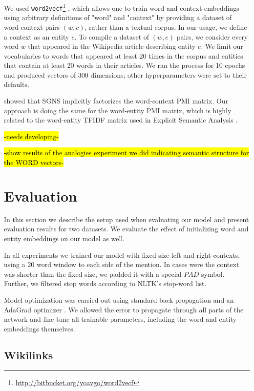 \documentclass[11pt]{article}
\begin{document}
We used \texttt{word2vecf}\footnote{\url{http://bitbucket.org/yoavgo/word2vecf}} \cite{levy2014dependency}, which allows one to train word and context embeddings using arbitrary definitions of "word" and "context" by providing a dataset of word-context pairs $(w,c)$, rather than a textual corpus. In our usage, we define a context as an entity $e$. To compile a dataset of $(w,e)$ pairs, we consider every word $w$ that appeared in the Wikipedia article describing entity $e$. We limit our vocabularies to words that appeared at least 20 times in the corpus and entities that contain at least 20 words in their articles. We ran the process for 10 epochs and produced vectors of 300 dimensions; other hyperparameters were set to their defaults.

 showed that SGNS implicitly factorizes the word-context PMI matrix. Our approach is doing the same for the word-entity PMI matrix, which is highly related to the word-entity TFIDF matrix used in Explicit Semantic Analysis \cite{gabrilovich2007computing}.

\hl{-needs developing-}

\hl{-show results of the analogies experiment we did indicating semantic structure for the WORD vectors-}



\section{Evaluation}
\label{experiments}

In this section we describe the setup used when evaluating our model and present evaluation results for two datasets. We evaluate the effect of initializing word and entity embeddings on our model as well.

In all experiments we trained our model with fixed size left and right contexts, using a 20 word window to each side of the mention. In cases were the context was shorter than the fixed size, we padded it with a special $PAD$ symbol. Further, we filtered stop words according to NLTK's stop-word list.

Model optimization was carried out using standard back propagation and an AdaGrad optimizer \cite{duchi2011adaptive}. We allowed the error to propagate through all parts of the network and fine tune all trainable parameters, including the word and entity embeddings themselves.

\subsection{Wikilinks}
\end{document}
